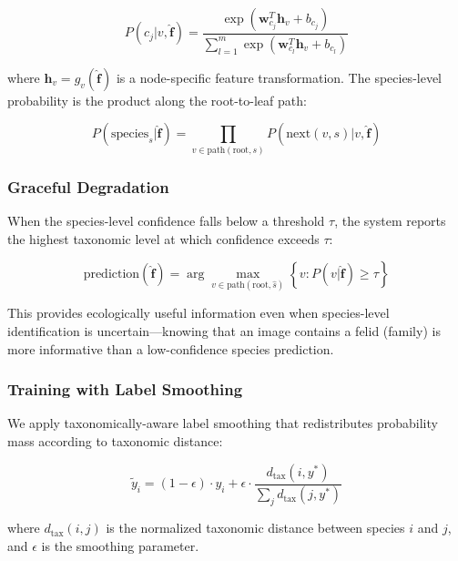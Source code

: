 \begin{equation}
P(c_j | v, \hat{\mathbf{f}}) = \frac{\exp(\mathbf{w}_{c_j}^T \mathbf{h}_v + b_{c_j})}{\sum_{l=1}^{m} \exp(\mathbf{w}_{c_l}^T \mathbf{h}_v + b_{c_l})}
\end{equation}

where $\mathbf{h}_v = g_v(\hat{\mathbf{f}})$ is a node-specific feature transformation. The species-level probability is the product along the root-to-leaf path:

\begin{equation}
P(\text{species}_s | \hat{\mathbf{f}}) = \prod_{v \in \text{path}(\text{root}, s)} P(\text{next}(v, s) | v, \hat{\mathbf{f}})
\end{equation}

\subsubsection{Graceful Degradation}

When the species-level confidence falls below a threshold $\tau$, the system reports the highest taxonomic level at which confidence exceeds $\tau$:

\begin{equation}
\text{prediction}(\hat{\mathbf{f}}) = \arg\max_{v \in \text{path}(\text{root}, \hat{s})} \left\{ v : P(v | \hat{\mathbf{f}}) \geq \tau \right\}
\end{equation}

This provides ecologically useful information even when species-level identification is uncertain---knowing that an image contains a felid (family) is more informative than a low-confidence species prediction.

\subsubsection{Training with Label Smoothing}

We apply taxonomically-aware label smoothing that redistributes probability mass according to taxonomic distance:

\begin{equation}
\tilde{y}_i = (1 - \epsilon) \cdot y_i + \epsilon \cdot \frac{d_{\text{tax}}(i, y^*)}{\sum_j d_{\text{tax}}(j, y^*)}
\end{equation}

where $d_{\text{tax}}(i, j)$ is the normalized taxonomic distance between species $i$ and $j$, and $\epsilon$ is the smoothing parameter.


